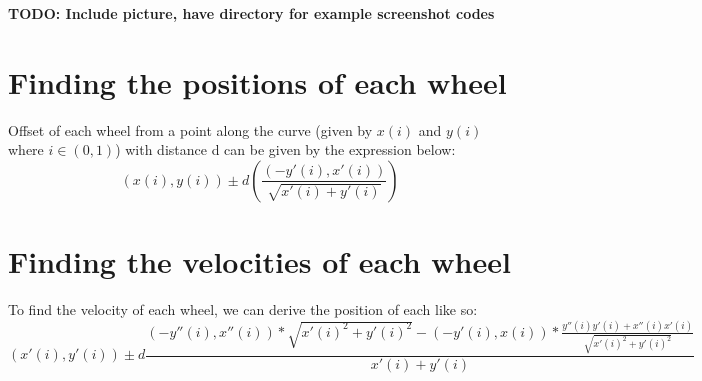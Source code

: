 \documentclass[12pt, english]{article}
\begin{document}
\textbf{TODO: Include picture, have directory for example screenshot codes}

\section{Finding the positions of each wheel}
Offset of each wheel from a point along the curve (given by $x(i)$ and $y(i)$ where $i\in(0,1)$) with distance d can be given by the expression below: \\
\begin{equation}
	(x(i), y(i)) \pm d \left(\frac{(-y'(i), x'(i))}{\sqrt{x'(i)+y'(i)}}\right)
\end{equation}

\section{Finding the velocities of each wheel}
To find the velocity of each wheel, we can derive the position of each like so:
\begin{equation}
	(x'(i), y'(i)) \pm d\frac{(-y''(i), x''(i))*\sqrt{x'(i)^2+y'(i)^2} - (-y'(i), x(i)) * \frac{y''(i)y'(i) + x''(i)x'(i)}{\sqrt{x'(i)^2+y'(i)^2}}}{x'(i)+y'(i)}
\end{equation}
\end{document}
